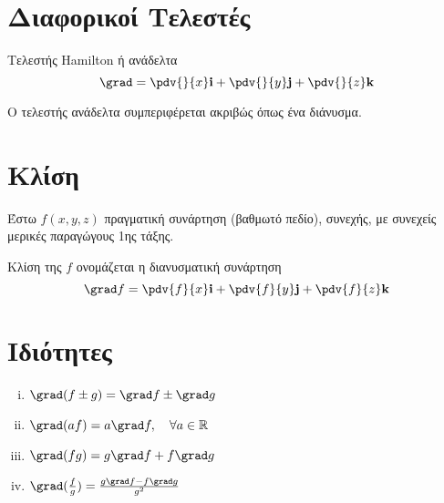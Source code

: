


\pagestyle{vangelis}
\everymath{\displaystyle}



\section{Διαφορικοί Τελεστές}

\begin{dfn}
  Τελεστής  \textcolor{Col1}{Hamilton} ή \textcolor{Col1}{ανάδελτα} 
  \[ \grad = \pdv{}{x} \mathbf{i} + \pdv{}{y} \mathbf{j} + \pdv{}{z} \mathbf{k} \]
\end{dfn}
\begin{rem}
Ο τελεστής ανάδελτα συμπεριφέρεται ακριβώς όπως ένα διάνυσμα.
\end{rem}

\section{Κλίση}

Έστω $ f(x,y,z) $ πραγματική συνάρτηση (βαθμωτό πεδίο), συνεχής, με συνεχείς μερικές 
παραγώγους 1ης τάξης.

\begin{dfn}
  \textcolor{Col1}{Κλίση} της $f$ ονομάζεται η \textcolor{Col1}{διανυσματική} συνάρτηση
  \[
    \grad f = \pdv{f}{x} \mathbf{i} + \pdv{f}{y} \mathbf{j} + \pdv{f}{z} \mathbf{k} 
  \] 
\end{dfn}

\section{Ιδιότητες}

\begin{enumerate}[i)]
  \item $ \grad (f \pm g) = \grad f \pm \grad g $
  \item $ \grad (a f) = a \grad f, \quad \forall a \in \mathbb{R}  $
  \item $ \grad (fg) =  g \grad f +  f\grad g $
  \item $ \grad (\frac{f}{g}) = \frac{g \grad f - f \grad g}{g^{2}}  $
\end{enumerate}


